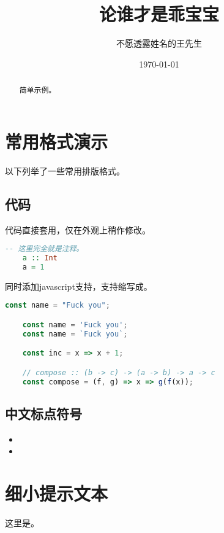 \documentclass{morelull}
\title{论谁才是乖宝宝}
\author{不愿透露姓名的王先生}
\date{\today}
\begin{document}
\maketitle

\begin{abstract}
    简单示例。
\end{abstract}

\tableofcontents

\section{常用格式演示}

以下列举了一些常用排版格式。

\subsection{代码}

代码直接套用，仅在外观上稍作修改。

\begin{lstlisting}[language=haskell]
    -- 这里完全就是注释。
    a :: Int
    a = 1
\end{lstlisting}

同时添加javascript支持，支持缩写成。

\begin{lstlisting}[language=js]
    const name = "Fuck you";

    const name = 'Fuck you';
    const name = `Fuck you`;

    const inc = x => x + 1;

    // compose :: (b -> c) -> (a -> b) -> a -> c
    const compose = (f, g) => x => g(f(x));
\end{lstlisting}

\subsection{中文标点符号}

\begin{itemize}
\item{}
\item{}
\end{itemize}

\section{细小提示文本}

\begin{yiys}
    这里是。
\end{yiys}
\end{document}
